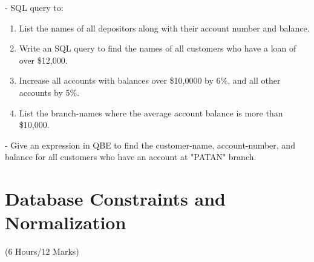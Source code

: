 \documentclass[12pt]{article}
\begin{document}
\begin{enumerate}
        - SQL query to:
        \begin{enumerate}[noitemsep, topsep = 0pt, label = \alph*.]
            \item List the names of all depositors along with their account number and balance.
            \item Write an SQL query to find the names of all customers who have a loan of over \$12,000.
            \item Increase all accounts with balances over \$10,0000 by 6\%, and all other accounts by 5\%.
            \item List the branch-names where the average account balance is more than \$10,000.
        \end{enumerate}

        - Give an expression in QBE to find the customer-name, account-number, and balance for all customers who have an account at "PATAN" branch.
    \end{enumerate}
        
    \pagebreak
\section{Database Constraints and Normalization}
    \begin{center}(6 Hours/12 Marks)\end{center}
\end{document}
